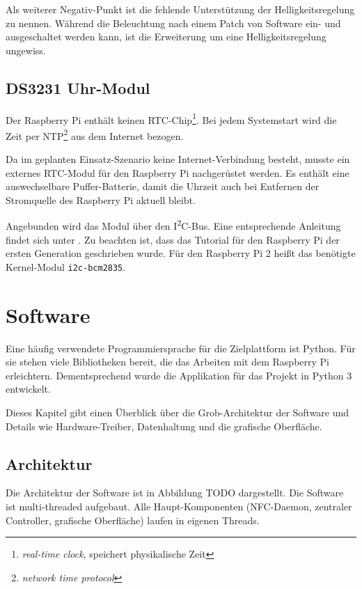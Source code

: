 \documentclass[11pt,a4paper]{IEEEtran}
\begin{document}
Als weiterer Negativ-Punkt ist die fehlende Unterstützung der
Helligkeitsregelung zu nennen. Während die Beleuchtung nach einem Patch von
Software ein- und ausgeschaltet werden kann, ist die Erweiterung um eine
Helligkeitsregelung ungewiss\autocite{TouchBacklight}.

\subsection{DS3231 Uhr-Modul}

Der Raspberry Pi enthält keinen RTC-Chip\footnote{\emph{real-time clock},
speichert physikalische Zeit}. Bei jedem Systemstart wird die Zeit per
NTP\footnote{\emph{network time protocol}} aus dem Internet bezogen.

Da im geplanten Einsatz-Szenario keine Internet-Verbindung besteht, musste ein
externes RTC-Modul für den Raspberry Pi nachgerüstet werden. Es enthält eine
auswechselbare Puffer-Batterie, damit die Uhrzeit auch bei Entfernen der
Stromquelle des Raspberry Pi aktuell bleibt. 

Angebunden wird das Modul über den I\textsuperscript{2}C-Bus. Eine entsprechende
Anleitung findet sich unter \autocite{DS3231Tutorial}. Zu beachten ist, dass
das Tutorial für den Raspberry Pi der ersten Generation geschrieben wurde. Für
den Raspberry Pi 2 heißt das benötigte Kernel-Modul \texttt{i2c-bcm2835}.

\section{Software} 
\label{sec:sw}

Eine häufig verwendete Programmiersprache für die Zielplattform ist Python. Für
sie stehen viele Bibliotheken bereit, die das Arbeiten mit dem Raspberry Pi 
erleichtern. Dementsprechend wurde die Applikation für das Projekt in Python 3
entwickelt.

Dieses Kapitel gibt einen Überblick über die Grob-Architektur der Software und
Details wie Hardware-Treiber, Datenhaltung und die grafische Oberfläche.

\subsection{Architektur}

Die Architektur der Software ist in Abbildung TODO dargestellt. Die Software
ist multi-threaded aufgebaut. Alle Haupt-Komponenten (NFC-Daemon, zentraler 
Controller, grafische Oberfläche) laufen in eigenen Threads. 
\end{document}
